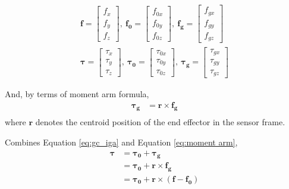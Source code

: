 \begin{equation*}
\begin{split}
\boldsymbol{f} = 
\begin{bmatrix}
f_{x}	\\
f_{y}	\\
f_{z}
\end{bmatrix},\ 
\boldsymbol{f_0} = 
\begin{bmatrix}
f_{0x}	\\
f_{0y}	\\
f_{0z}
\end{bmatrix},\ 
\boldsymbol{f_g} = 
\begin{bmatrix}
f_{gx}	\\
f_{gy}	\\
f_{gz}
\end{bmatrix}\\
\boldsymbol{\tau} = 
\begin{bmatrix}
\tau_{x}		\\
\tau_{y}		\\
\tau_{z}	
\end{bmatrix},\ 
\boldsymbol{\tau_0} = 
\begin{bmatrix}
\tau_{0x}		\\
\tau_{0y}		\\
\tau_{0z}	
\end{bmatrix},\ 
\boldsymbol{\tau_g} = 
\begin{bmatrix}
\tau_{gx}		\\
\tau_{gy}		\\
\tau_{gz}	
\end{bmatrix}
\end{split}
\end{equation*}
\par\noindent
And, by terms of moment arm formula,
\begin{equation}
\label{eq:moment arm}
\begin{split}
\boldsymbol{\tau_g}	&= \boldsymbol{r} \times \boldsymbol{f_g} \\
\end{split}
\end{equation}
where $\boldsymbol{r}$ denotes the centroid position of the end effector in the sensor frame.
\par\noindent
Combines Equation \ref{eq:gc_iga} and Equation \ref{eq:moment arm},
\begin{equation}
\label{eq: middle}
\begin{split}
\boldsymbol{\tau}	&=	\boldsymbol{\tau_0}		+\boldsymbol{\tau_g}			\\
					&= 	\boldsymbol{\tau_0}	 	+\boldsymbol{r} \times \boldsymbol{f_g}	\\
					&=  \boldsymbol{\tau_0}		+\boldsymbol{r}	\times \left( \boldsymbol{f} - \boldsymbol{f_0} \right) 
\end{split}
\end{equation}
